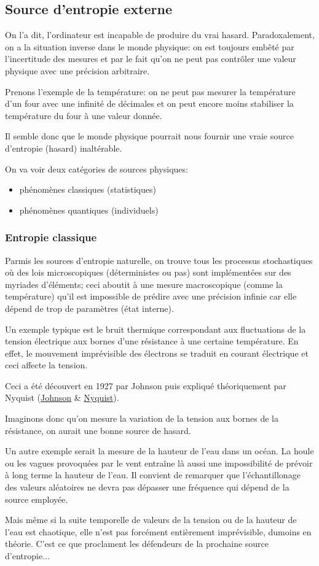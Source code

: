 \documentclass{scrartcl}
\begin{document}
\subsection{Source d'entropie externe}
On l'a dit, l'ordinateur est incapable de produire du vrai hasard. Paradoxalement, on a la situation inverse dans le monde physique: on est toujours embêté par l’incertitude des mesures et par le fait qu’on ne peut pas contrôler une valeur physique avec une précision arbitraire. \par
Prenons l’exemple de la température: on ne peut pas mesurer la température d’un four avec une infinité de décimales et on peut encore moins stabiliser la température du four à une valeur donnée. \par
Il semble donc que le monde physique pourrait nous fournir une vraie source d’entropie (hasard) inaltérable. \par
On va voir deux catégories de sources physiques:
\begin{itemize}
\item phénomènes classiques (statistiques)
\item phénomènes quantiques (individuels)
\end{itemize}

\subsubsection{Entropie classique}
Parmis les sources d’entropie naturelle, on trouve tous les processus stochastiques où des lois microscopiques (déterministes ou pas) sont implémentées sur des myriades d’éléments; ceci aboutit à une mesure macroscopique (comme la température) qu’il est impossible de prédire avec une précision infinie car elle dépend de trop de paramètres (état interne). \par
Un exemple typique est le bruit thermique correspondant aux fluctuations de la tension électrique aux bornes d’une résistance à une certaine température. En effet, le mouvement imprévisible des électrons se traduit en courant électrique et ceci affecte la tension. \par
Ceci a été découvert en 1927 par Johnson puis expliqué théoriquement par Nyquist (\href{https://journals.aps.org/pr/abstract/10.1103/PhysRev.32.97}{Johnson} \& \href{https://journals.aps.org/pr/abstract/10.1103/PhysRev.32.110}{Nyquist}). \par
Imaginons donc qu’on mesure la variation de la tension aux bornes de la résistance, on aurait une bonne source de hasard. \par
Un autre exemple serait la mesure de la hauteur de l'eau dans un océan. La houle ou les vagues provoquées par le vent entraîne là aussi une impossibilité de prévoir à long terme la hauteur de l'eau. Il convient de remarquer que l'échantillonage des valeurs aléatoires ne devra pas dépasser une fréquence qui dépend de la source employée. \par
Mais même si la suite temporelle de valeurs de la tension ou de la hauteur de l'eau est chaotique, elle n'est pas forcément entièrement imprévisible, dumoins en théorie. C'est ce que proclament les défendeurs de la prochaine source d'entropie...
\end{document}
